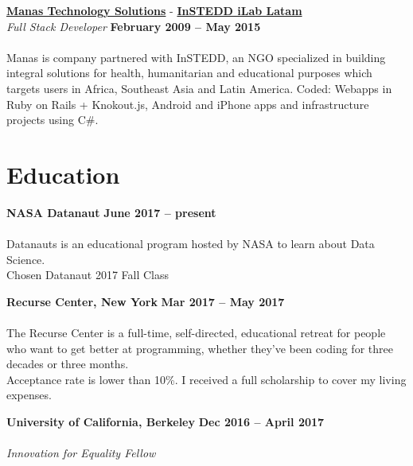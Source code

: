 \documentclass[margin,line]{resume}
\begin{document}
\begin{resume}
\textbf{\href{http://www.manas.com.ar/}{Manas Technology Solutions}} - 
\textbf{\href{http://www.instedd.org/}{InSTEDD iLab Latam}}\vspace{2mm}\\\vspace{1mm}
\textsl{Full Stack Developer} \hfill \textbf{February 2009 -- May 2015}\vspace{-3mm}\\\vspace{-1mm}
\\
Manas is company partnered with InSTEDD, an NGO specialized in building integral solutions for health, humanitarian and educational purposes which targets users in Africa, Southeast Asia and Latin America.  
Coded: Webapps in Ruby on Rails + Knokout.js, Android and iPhone  apps and infrastructure projects using C\#.



\section{\mysidestyle Education}


\textbf{NASA Datanaut} \hfill \textbf{June 2017 -- present}\vspace{-3mm}\\\vspace{-1mm}
\\
Datanauts is an educational program hosted by NASA to learn about Data Science.
\\
Chosen Datanaut 2017 Fall Class



\textbf{Recurse Center, New York} \hfill \textbf{Mar 2017 -- May 2017}\vspace{-3mm}\\\vspace{-1mm}
\\
The Recurse Center is a full-time, self-directed, educational retreat for people who want to get better at programming, whether they've been coding for three decades or three months.  \\
Acceptance rate is lower than 10\%. I received a full scholarship to cover my living expenses.


\textbf{University of California, Berkeley} \hfill \textbf{Dec 2016 -- April 2017}\vspace{-3mm}\\\vspace{-1mm}
\\
\textsl{Innovation for Equality Fellow} 



\end{resume}
\end{document}
